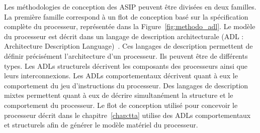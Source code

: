 Les méthodologies de conception des ASIP peuvent être divisées en deux familles. La première famille correspond à un flot de conception basé sur la spécification complète du processeur, représentée dans la Figure~\ref{fig:methodo_adl}. Le modèle du processeur est décrit dans un langage de description architecturale (ADL : Architecture Description Language)~\cite{mishra2011processor}. Ces langages de description permettent de définir précisément l'architecture d'un processeur. Ils peuvent être de différents types. Les ADLs structurels décrivent les composants des processeurs ainsi que leurs interconnexions. Les ADLs comportementaux décrivent quant à eux le comportement du jeu d'instructions du processeur. Des langages de description mixtes permettent quant à eux de décrire simultanément la structure et le comportement du processeur. Le flot de conception utilisé pour concevoir le processeur décrit dans le chapitre~\ref{chap:tta} utilise des ADLs comportementaux et structurels afin de générer le modèle matériel du processeur.


